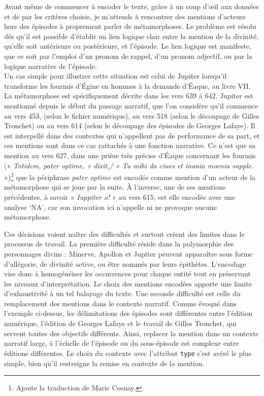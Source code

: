 \documentclass[
  letterpaper,
  DIV=11,
  numbers=noendperiod]{scrreprt}
\begin{document}
Avant même de commencer à encoder le texte, grâce à un coup d'œil aux
données et de par les critères choisis, je m'attends à rencontrer des
mentions d'acteurs hors des épisodes à proprement parler de
métamorphoses. Le problème est résolu dès qu'il est possible d'établir
un lien logique clair entre la mention de la divinité, qu'elle soit
antérieure ou postérieure, et l'épisode. Le lien logique est manifeste,
que ce soit par l'emploi d'un pronom de rappel, d'un pronom adjectif, ou
par la logique narrative de l'épisode.\\
Un cas simple pour illustrer cette situation est celui de Jupiter
lorsqu'il transforme les fourmis d'Égine en hommes à la demande d'Éaque,
au livre VII. La métamorphose est spécifiquement décrite dans les vers
639 à 642. Jupiter est mentionné depuis le début du passage narratif,
que l'on considère qu'il commence au vers 453, (selon le fichier
numérique), au vers 518 (selon le découpage de Gilles Tronchet) ou au
vers 614 (selon le découpage des épisodes de Georges Lafaye). Il est
interpellé dans des contextes qui n'appellent pas de performance de sa
part, et ces mentions sont dans ce cas rattachés à une fonction
narrative. Ce n'est que sa mention au vers 627, dans une prière très
précise d'Éaque concernant les fourmis (« \emph{Totidem, pater optime, »
dixit,/ « Tu mihi da ciues et inania moenia supple.} »)\footnote{Ajoute
  la traduction de Marie Cosnay.} que la périphrase \emph{pater optime}
est encodée comme mention d'un acteur de la métamorphose qui se joue par
la suite. À l'inverse, une de ses mentions précédentes, à savoir «
\emph{Iuppiter o!} » au vers 615, est elle encodée avec une analyse
`NA', car son invocation ici n'appelle ni ne provoque aucune
métamorphose.

Ces décisions voient naître des difficultés et surtout créent des
limites dans le processus de travail. La première difficulté réside dans
la polymorphie des personnages divins : Minerve, Apollon et Jupiter
peuvent apparaître sous forme d'allégorie, de divinité active, ou être
nommés par leurs épithètes. L'encodage vise donc à homogénéiser les
occurrences pour chaque entité tout en préservant les niveaux
d'interprétation. Le choix des mentions encodées apporte une limite
d'exhaustivité à un tel balayage du texte. Une seconde difficulté est
celle du remplacement des mentions dans le contexte narratif. Comme
évoqué dans l'exemple ci-dessus, les délimitations des épisodes sont
différentes entre l'édition numérique, l'édition de Georges Lafaye et le
travail de Gilles Tronchet, qui servent toutes des objectifs différents.
Ainsi, replacer la mention dans un contexte narratif large, à l'échelle
de l'épisode ou du sous-épisode est complexe entre éditions différentes.
Le choix du contexte avec l'attribut \texttt{type} s'est avéré le plus
simple, bien qu'il restreigne la remise en contexte de la mention.
\end{document}
